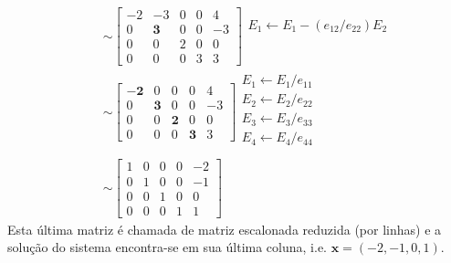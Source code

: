 \begin{ex}
\begin{align}
\begin{array}{l}
      \\
    \end{array}\\
    &\sim       
      \begin{bmatrix}
        -2 & -3 & 0 & 0 & 4\\
        0 & \pmb{3} & 0 & 0 & -3\\
        0 & 0 & 2 & 0 & 0\\
        0 & 0 & 0 & 3 & 3
      \end{bmatrix}
      \begin{array}{l}
      E_1 \leftarrow E_1 - (e_{12}/e_{22})E_2\\
      \\
      \\
      \\
    \end{array}\\
    &\sim       
      \begin{bmatrix}
        \pmb{-2} & 0 & 0 & 0 & 4\\
        0 & \pmb{3} & 0 & 0 & -3\\
        0 & 0 & \pmb{2} & 0 & 0\\
        0 & 0 & 0 & \pmb{3} & 3
      \end{bmatrix}
      \begin{array}{l}
      E_1 \leftarrow E_1/e_{11}\\
      E_2 \leftarrow E_2/e_{22}\\
      E_3 \leftarrow E_3/e_{33}\\
      E_4 \leftarrow E_4/e_{44}\\
    \end{array}\\
    &\sim       
      \begin{bmatrix}
        1 & 0 & 0 & 0 & -2\\
        0 & 1 & 0 & 0 & -1\\
        0 & 0 & 1 & 0 & 0\\
        0 & 0 & 0 & 1 & 1
      \end{bmatrix}
  \end{align}
Esta última matriz é chamada de matriz escalonada reduzida (por linhas) e a solução do sistema encontra-se em sua última coluna, i.e. $\pmb{x} = (-2, -1, 0, 1)$.

% 
\end{ex}

